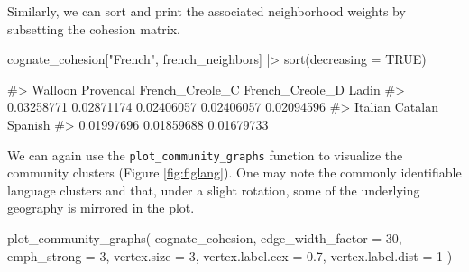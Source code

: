 Similarly, we can sort and print the associated neighborhood weights by
subsetting the cohesion matrix.

\begin{Schunk}
\begin{Sinput}
cognate_cohesion["French", french_neighbors] |>
  sort(decreasing = TRUE)
\end{Sinput}
\begin{Soutput}
#>         Walloon       Provencal French_Creole_C French_Creole_D           Ladin
#>      0.03258771      0.02871174      0.02406057      0.02406057      0.02094596
#>         Italian         Catalan         Spanish
#>      0.01997696      0.01859688      0.01679733
\end{Soutput}
\end{Schunk}

We can again use the \texttt{plot\_community\_graphs} function to
visualize the community clusters (Figure \ref{fig:figlang}). One may
note the commonly identifiable language clusters and that, under a
slight rotation, some of the underlying geography is mirrored in the
plot.

\begin{Schunk}
\begin{Sinput}
plot_community_graphs(
  cognate_cohesion,
  edge_width_factor = 30,
  emph_strong = 3,
  vertex.size = 3,
  vertex.label.cex = 0.7,
  vertex.label.dist = 1
)
\end{Sinput}
\end{Schunk}

